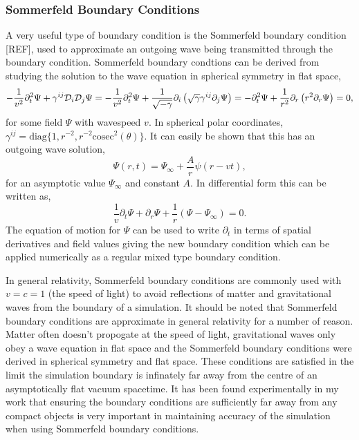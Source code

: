 \subsubsection{Sommerfeld Boundary Conditions}
A very useful type of boundary condition is the Sommerfeld boundary condition [REF], used to approximate an outgoing wave being transmitted through the boundary condition. Sommerfeld boundary condtions can be derived from studying the solution to the wave equation in spherical symmetry in flat space,
\begin{equation}
-\frac{1}{v^2}\partial_t^2 \Psi +  \gamma^{ij}\mathcal{D}_i \mathcal{D}_j \Psi = 
-\frac{1}{v^2}\partial_t^2 \Psi +\frac{1}{\sqrt{-\gamma}} \partial_i \left(\sqrt{\gamma} \gamma^{ij} \partial_j \Psi \right) =
-\partial^2_t \Psi + \frac{1}{r^2}\partial_r \left( r^2 \partial_r \Psi\right)=0,
\end{equation}
for some field $\Psi$ with wavespeed $v$. In spherical polar coordinates, $\gamma^{ij}=\mathrm{diag}\{1,r^{-2},r^{-2} \mathrm{cosec}^2(\theta) \}$. It can easily be shown that this has an outgoing wave solution,
\begin{equation}
\Psi(r,t) = \Psi_\infty + \frac{A}{r}\psi(r-vt),
\end{equation}
for an asymptotic value $\Psi_\infty$ and constant $A$. In differential form this can be written as,
\begin{equation}
\frac{1}{v}\partial_t \Psi + \partial_r \Psi+ \frac{1}{r}(\Psi-\Psi_\infty) =0.
\end{equation}
The equation of motion for $\Psi$ can be used to write $\partial_t$ in terms of spatial derivatives and field values giving the new boundary condition which can be applied numerically as a regular mixed type boundary condition. 

In general relativity, Sommerfeld boundary conditions are commonly used with $v=c=1$ (the speed of light) to avoid reflections of matter and gravitational waves from the boundary of a simulation. It should be noted that Sommerfeld boundary conditions are approximate in general relativity for a number of reason. Matter often doesn't propogate at the speed of light, gravitational waves only obey a wave equation in flat space and the Sommerfeld boundary conditions were derived in spherical symmetry and flat space. These conditions are satisfied in the limit the simulation boundary is infinately far away from the centre of an asymptotically flat vacuum spacetime. It has been found experimentally in my work that ensuring the boundary conditions are sufficiently far away from any compact objects is very important in maintaining accuracy of the simulation when using Sommerfeld boundary conditions.


